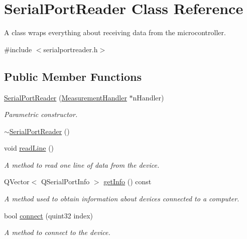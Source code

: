 \hypertarget{class_serial_port_reader}{}\section{Serial\+Port\+Reader Class Reference}
\label{class_serial_port_reader}


A class wraps everything about receiving data from the microcontroller.  




{\ttfamily \#include $<$serialportreader.\+h$>$}

\subsection*{Public Member Functions}
\begin{DoxyCompactItemize}
\item 
\mbox{\hyperlink{class_serial_port_reader_aef65d0e76f65204aaa57ecfc144c827d}{Serial\+Port\+Reader}} (\mbox{\hyperlink{class_measurement_handler}{Measurement\+Handler}} $\ast$n\+Handler)
\begin{DoxyCompactList}\small\item\em Parametric constructor. \end{DoxyCompactList}\item 
\mbox{\hyperlink{class_serial_port_reader_a7f01c445adf0d64d8acd67cd4fcd3b21}{$\sim$\+Serial\+Port\+Reader}} ()
\item 
void \mbox{\hyperlink{class_serial_port_reader_afb9bdbade338b204f487f2c0d4535911}{read\+Line}} ()
\begin{DoxyCompactList}\small\item\em A method to read one line of data from the device. \end{DoxyCompactList}\item 
Q\+Vector$<$ Q\+Serial\+Port\+Info $>$ \mbox{\hyperlink{class_serial_port_reader_a5a919fb6b06f5505de1aababcde045f6}{get\+Info}} () const
\begin{DoxyCompactList}\small\item\em A method used to obtain information about devices connected to a computer. \end{DoxyCompactList}\item 
bool \mbox{\hyperlink{class_serial_port_reader_ad00028795b4f33ffb0a97cd76726c4fd}{connect}} (quint32 index)
\begin{DoxyCompactList}\small\item\em A method to connect to the device. \end{DoxyCompactList}\item 

\end{DoxyCompactItemize}

